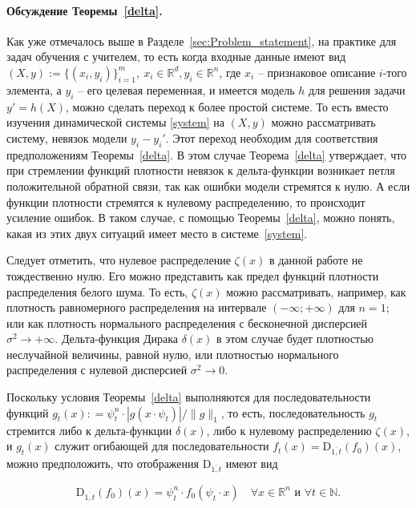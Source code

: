        \paragraph{Обсуждение Теоремы~\ref{delta}.} Как уже отмечалось выше в Разделе~\ref{sec:Problem_statement}, на практике для задач обучения с учителем, то есть когда входные данные имеют вид $(X, y) := \{(x_i, y_i)\}_{i=1}^m, ~x_i \in \mathbb{R}^d, y_i \in \mathbb{R}^n$, где $x_i$ -- признаковое описание $i$-того элемента, а $y_i$ -- его целевая переменная, и имеется модель $h$ для решения задачи $y' = h(X)$, можно сделать переход к более простой системе. 
        То есть вместо изучения динамической системы \eqref{system} на $(X, y)$ можно рассматривать систему, невязок модели $y_i - y_i'$. Этот переход необходим для соответствия предположениям Теоремы~\ref{delta}. В этом случае Теорема~\ref{delta} утверждает, что при стремлении функций плотности невязок к дельта-функции возникает петля положительной обратной связи, так как ошибки модели стремятся к нулю. А если функции плотности стремятся к нулевому распределению, то происходит усиление ошибок. В таком случае, с помощью Теоремы~\ref{delta}, можно понять, какая из этих двух ситуаций имеет место в системе~\eqref{system}.
    
        Следует отметить, что нулевое распределение $\zeta(x)$ в данной работе не тождественно нулю. Его можно представить как предел функций плотности распределения белого шума. То есть, $\zeta(x)$ можно рассматривать, например, как плотность равномерного распределения на интервале $(-\infty; +\infty)$ для $n=1$; или как плотность нормального распределения с бесконечной дисперсией $\sigma^2 \to +\infty$. Дельта-функция Дирака $\delta(x)$ в этом случае будет плотностью неслучайной величины, равной нулю, или плотностью нормального распределения с нулевой дисперсией $\sigma^2 \to 0$.
    
        Поскольку условия Теоремы~\ref{delta} выполняются для последовательности функций $g_t(x) : = \psi_t^n \cdot |g(x \cdot \psi_t)| / \|g\|_1$, то есть, последовательность $g_t$ стремится либо к дельта-функции $\delta(x)$, либо к нулевому распределению $\zeta(x)$, и $g_t(x)$ служит огибающей для последовательности $f_t(x) = \text{D}_{\overline{1, t}}(f_0)(x)$, можно предположить, что отображения $\text{D}_{\overline{1, t}}$ имеют вид
    
        \begin{equation} \label{cool_D}
            \text{D}_{\overline{1, t}}(f_0)(x) = \psi_t^n \cdot f_0(\psi_t \cdot x) \quad \forall x \in \mathbb{R}^n \text{ и } \forall t \in \mathbb{N}.
        \end{equation}
    
